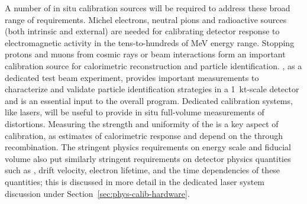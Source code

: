 A number of in situ calibration sources will be required to address these broad range of requirements. 
Michel electrons, neutral pions and radioactive sources (both intrinsic and external) are needed for calibrating detector response to electromagnetic activity in the tens-to-hundreds of MeV energy range. Stopping protons and muons from cosmic rays or beam interactions form an important calibration source for calorimetric reconstruction and particle identification. 
, as a dedicated test beam experiment, provides important measurements to characterize and validate particle identification strategies in a \SI{1}{kt}-scale detector and is an essential input to the overall program. Dedicated calibration systems, like lasers, will be useful to provide in situ full-volume measurements of \efield distortions. 
Measuring the strength and uniformity of the \efield is a key aspect of calibration, as  estimates of calorimetric response and  depend on the \efield through recombination. The stringent physics requirements on energy scale and fiducial volume also put similarly stringent requirements on detector physics quantities such as \efield, drift velocity, electron lifetime, and the time dependencies of these quantities; this is discussed in more detail in 
the dedicated laser system discussion under Section~\ref{sec:phys-calib-hardware}.


